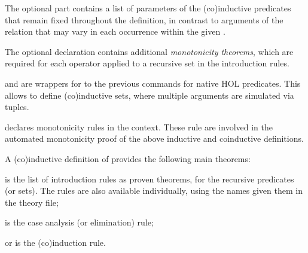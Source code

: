 \begin{isabellebody}
\begin{isamarkuptext}
\begin{description}
  The optional \hyperlink{keyword.for}{\mbox{}} part contains a list of parameters of
  the (co)inductive predicates that remain fixed throughout the
  definition, in contrast to arguments of the relation that may vary
  in each occurrence within the given .

  The optional \hyperlink{keyword.monos}{\mbox{}} declaration contains additional
  \emph{monotonicity theorems}, which are required for each operator
  applied to a recursive set in the introduction rules.

  \item \hyperlink{command.HOL.inductive-set}{\mbox{}} and \hyperlink{command.HOL.coinductive-set}{\mbox{}} are wrappers for to the previous commands for
  native HOL predicates.  This allows to define (co)inductive sets,
  where multiple arguments are simulated via tuples.

  \item \hyperlink{attribute.HOL.mono}{\mbox{}} declares monotonicity rules in the
  context.  These rule are involved in the automated monotonicity
  proof of the above inductive and coinductive definitions.

  \end{description}%
\end{isamarkuptext}%
\isamarkuptrue%
%
\isamarkuptrue%
%
\begin{isamarkuptext}%
A (co)inductive definition of  provides the following
  main theorems:

  \begin{description}

  \item {} is the list of introduction rules as proven
  theorems, for the recursive predicates (or sets).  The rules are
  also available individually, using the names given them in the
  theory file;

  \item {} is the case analysis (or elimination) rule;

  \item {} or  is the (co)induction
  rule.


\end{description}
\end{isamarkuptext}
\end{isabellebody}
